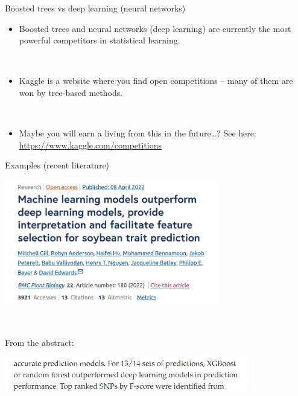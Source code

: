 \documentclass[
  10pt,
  ignorenonframetext,
]{beamer}
\providecommand{\tightlist}{%
  \setlength{\itemsep}{0pt}\setlength{\parskip}{0pt}}
\begin{document}
\begin{frame}
\begin{block}{Boosted trees vs deep learning (neural networks)}
\label{boosted-trees-vs-deep-learning-neural-networks}
\(~\)

\begin{itemize}
\tightlist
\item
  Boosted trees and neural networks (deep learning) are currently the
  most powerful competitors in statistical learning.
\end{itemize}

\(~\)

\begin{itemize}
\tightlist
\item
  Kaggle is a website where you find open competitions -- many of them
  are won by tree-based methods.
\end{itemize}

\(~\)

\begin{itemize}
\tightlist
\item
  Maybe you will earn a living from this in the future\ldots? See
  here:\\
  \url{https://www.kaggle.com/competitions}
\end{itemize}
\end{block}
\end{frame}

\begin{frame}
\begin{block}{Examples (recent literature)}
\label{examples-recent-literature}
\centering

\includegraphics[width=0.7\textwidth,height=\textheight]{graphics/trees_vs_nns.png}

\(~\)

\flushleft

From the abstract:

\includegraphics[width=0.8\textwidth,height=\textheight]{graphics/outperform.png}
\end{block}
\end{frame}
\end{document}
